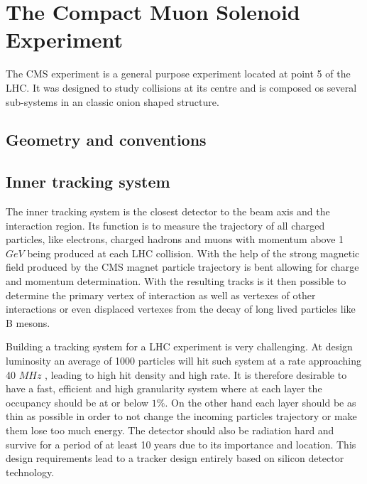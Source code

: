\section{The Compact Muon Solenoid Experiment}
\label{SECTION:ExperimentalApparatus_CMS}

The \gls{CMS} experiment is a general purpose experiment located at point 5 of the \gls{LHC}. It was designed to study collisions at its centre and is composed os several sub-systems in an classic onion shaped structure.


\subsection{Geometry and conventions}


\subsection{Inner tracking system}
\label{SUBSECTION:ExperimentalApparatus_CMS_Tracker}


The inner tracking system is the closest detector to the beam axis and the interaction region. Its function is to measure the trajectory of all charged particles, like electrons, charged hadrons and muons with momentum above 1 $GeV$ being produced at each \gls{LHC} collision. With the help of the strong magnetic field produced by the \gls{CMS} magnet particle trajectory is bent allowing for charge and momentum determination. With the resulting tracks is it then possible to determine the primary vertex of interaction as well as vertexes of other interactions or even displaced vertexes from the decay of long lived particles like B mesons. 

Building a tracking system for a \gls{LHC} experiment is very challenging. At design luminosity an average of 1000 particles will hit such system at a rate approaching 40 $MHz$ , leading to high hit density and high rate. It is therefore desirable to have a fast, efficient and high granularity system where at each layer the occupancy should be at or below $1\%$. On the other hand each layer should be as thin as possible in order to not change the incoming particles trajectory or make them lose too much energy. The detector should also be radiation hard and survive for a period of at least 10 years due to its importance and location. This design requirements lead to a tracker design entirely based on silicon detector technology. 

